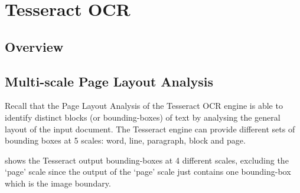 
\chapter{Tesseract OCR}

\ifpdf
    \graphicspath{{Chapter4/Figs/Raster/}{Chapter4/Figs/PDF/}{Chapter4/Figs/}}
\else
    \graphicspath{{Chapter4/Figs/Vector/}{Chapter4/Figs/}}
\fi


\section{Overview}


\section{Multi-scale Page Layout Analysis}

Recall that the Page Layout Analysis of the Tesseract OCR engine is able to identify distinct blocks (or bounding-boxes) of text by analysing the general layout of the input document. The Tesseract engine can provide different sets of bounding boxes at 5 scales: word, line, paragraph, block and page.

 shows the Tesseract output bounding-boxes at 4 different scales, excluding the `page' scale since the output of the `page' scale just contains one bounding-box which is the image boundary.

